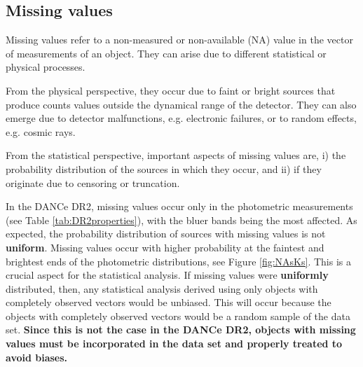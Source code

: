 \subsection{Missing values}
\label{sect:missing}

Missing values refer to a non-measured or non-available (NA) value in the vector of measurements of an object. They can arise due to different statistical or physical processes. 

From the physical perspective, they occur due to faint or bright sources that produce counts values outside the dynamical range of the detector. They can also emerge due to detector malfunctions, e.g. electronic failures, or to random effects, e.g. cosmic rays. 

From the statistical perspective, important aspects of missing values are, i) the probability distribution of the sources in which they occur, and ii) if they originate due to censoring or truncation. 

In the DANCe DR2, missing values occur only in the photometric measurements (see Table \ref{tab:DR2properties}), with the bluer bands being the most affected. As expected, the probability distribution of sources with missing values is not \textbf{uniform}. Missing values occur with higher probability at the faintest and brightest ends of the photometric distributions, see Figure \ref{fig:NAsKs}. This is a crucial aspect for the statistical analysis. If missing values were \textbf{uniformly} distributed, then, any statistical analysis derived using only objects with completely observed vectors would be unbiased. This will occur because the objects with completely observed vectors would be a random sample of the data set. \textbf{Since this is not the case in the DANCe DR2, objects with missing values must be incorporated in the data set and properly treated to avoid biases.} 

